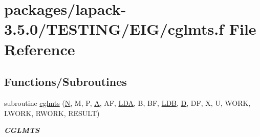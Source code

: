 \hypertarget{cglmts_8f}{}\section{packages/lapack-\/3.5.0/\+T\+E\+S\+T\+I\+N\+G/\+E\+I\+G/cglmts.f File Reference}
\label{cglmts_8f}
\subsection*{Functions/\+Subroutines}
\begin{DoxyCompactItemize}
\item 
subroutine \hyperlink{group__complex__eig_ga4283cb04f906b24363d97745e2ce10bd}{cglmts} (\hyperlink{polmisc_8c_a0240ac851181b84ac374872dc5434ee4}{N}, M, P, \hyperlink{classA}{A}, A\+F, \hyperlink{example__user_8c_ae946da542ce0db94dced19b2ecefd1aa}{L\+D\+A}, B, B\+F, \hyperlink{example__user_8c_a50e90a7104df172b5a89a06c47fcca04}{L\+D\+B}, \hyperlink{odrpack_8h_a7dae6ea403d00f3687f24a874e67d139}{D}, D\+F, X, U, W\+O\+R\+K, L\+W\+O\+R\+K, R\+W\+O\+R\+K, R\+E\+S\+U\+L\+T)
\begin{DoxyCompactList}\small\item\em {\bfseries C\+G\+L\+M\+T\+S} \end{DoxyCompactList}\end{DoxyCompactItemize}
